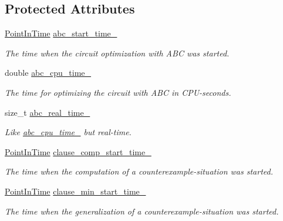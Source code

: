 \subsection*{Protected Attributes}
\begin{DoxyCompactItemize}
\item 
\hyperlink{Stopwatch_8h_af3a9f634f27bed7e98dbc23e5c6f807d}{Point\-In\-Time} \hyperlink{classLearningExtractorStatistics_ac16b676d2eb3fe71af340233a37a9ca9}{abc\-\_\-start\-\_\-time\-\_\-}
\begin{DoxyCompactList}\small\item\em The time when the circuit optimization with A\-B\-C was started. \end{DoxyCompactList}\item 
double \hyperlink{classLearningExtractorStatistics_a58056982bf57dbe69cff268d9a9d4a32}{abc\-\_\-cpu\-\_\-time\-\_\-}
\begin{DoxyCompactList}\small\item\em The time for optimizing the circuit with A\-B\-C in C\-P\-U-\/seconds. \end{DoxyCompactList}\item 
size\-\_\-t \hyperlink{classLearningExtractorStatistics_a4bdc0c5fba7ef60dbf974f212b4b1f17}{abc\-\_\-real\-\_\-time\-\_\-}
\begin{DoxyCompactList}\small\item\em Like \hyperlink{classLearningExtractorStatistics_a58056982bf57dbe69cff268d9a9d4a32}{abc\-\_\-cpu\-\_\-time\-\_\-} but real-\/time. \end{DoxyCompactList}\item 
\hyperlink{Stopwatch_8h_af3a9f634f27bed7e98dbc23e5c6f807d}{Point\-In\-Time} \hyperlink{classLearningExtractorStatistics_a476eba034e9e2004d0fe0b2bdeafbd1e}{clause\-\_\-comp\-\_\-start\-\_\-time\-\_\-}
\begin{DoxyCompactList}\small\item\em The time when the computation of a counterexample-\/situation was started. \end{DoxyCompactList}\item 
\hyperlink{Stopwatch_8h_af3a9f634f27bed7e98dbc23e5c6f807d}{Point\-In\-Time} \hyperlink{classLearningExtractorStatistics_aad8e031085a746b5fc30b8185bf5dabf}{clause\-\_\-min\-\_\-start\-\_\-time\-\_\-}
\begin{DoxyCompactList}\small\item\em The time when the generalization of a counterexample-\/situation was started. \end{DoxyCompactList}\item 

\end{DoxyCompactItemize}
